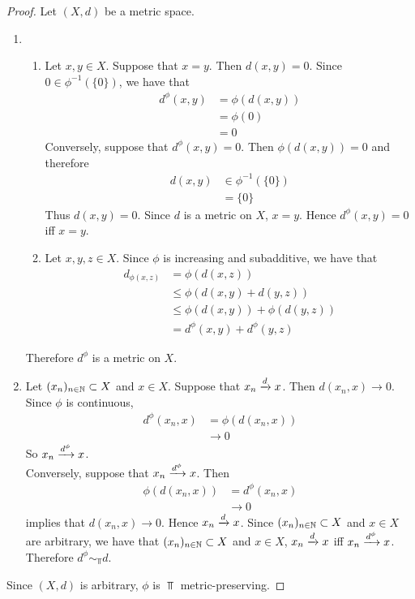 \documentclass{book}
\begin{document}
\begin{proof}
	Let $(X, d)$ be a metric space.
	\begin{enumerate}
		\item
		\begin{enumerate}
			\item Let $x, y \in X$. Suppose that $x = y$. Then $d(x,y) = 0$. Since $0 \in \phi^{-1}(\{0\})$, we have that
			\begin{align*}
				d^{\phi} (x,y)
				& = \phi(d(x,y)) \\
				& = \phi(0) \\
				& = 0
			\end{align*}
			Conversely, suppose that $ d^{\phi}(x,y) = 0$. Then $\phi(d(x,y)) = 0$ and therefore
			\begin{align*}
				d(x,y)
				& \in \phi^{-1}(\{0\}) \\
				& = \{0\}
			\end{align*}
			Thus $d(x,y) = 0$. Since $d$ is a metric on $X$, $x = y$. Hence $d^{\phi}(x,y) = 0$ iff $x = y$.
			\item Let $x,y,z \in X$. Since $\phi$ is increasing and subadditive, we have that
			\begin{align*}
				d_{\phi(x,z)}
				& = \phi(d(x,z)) \\
				& \leq \phi(d(x,y) + d(y,z)) \\
				& \leq \phi(d(x,y)) + \phi(d(y,z)) \\
				& = d^{\phi}(x,y) + d^{\phi}(y,z)
			\end{align*}
		\end{enumerate}
		Therefore $d^{\phi}$ is a metric on $X$. 
		\item Let $(x_n)_{n \in \mathbb{N}} \subset X$ and $x \in X$. Suppose that $x_n \xrightarrow{d} x$. Then $d(x_n, x) \rightarrow 0$. Since $\phi$ is continuous, 
		\begin{align*}
			d^{\phi}(x_n, x)
			& = \phi(d(x_n,x)) \\
			& \rightarrow 0 
		\end{align*}
		So $x_n \xrightarrow{d^{\phi}} x$. \\
		Conversely, suppose that $x_n \xrightarrow{d^{\phi}} x$. Then 
		\begin{align*}
			\phi(d(x_n,x))
			& = d^{\phi}(x_n, x) \\
			& \rightarrow 0
		\end{align*}
		 implies that $d(x_n,x) \rightarrow 0$. Hence $x_n \xrightarrow{d} x$. Since $(x_n)_{n \in \mathbb{N}} \subset X$ and $x \in X$ are arbitrary, we have that $(x_n)_{n \in \mathbb{N}} \subset X$ and $x \in X$, $x_n \xrightarrow{d} x$ iff $x_n \xrightarrow{d^{\phi}} x$. Therefore $d^{\phi} \sim_{\Top} d$. 
	\end{enumerate}
	Since $(X, d)$ is arbitrary, $\phi$ is $\Top$ metric-preserving.
\end{proof}
\end{document}

